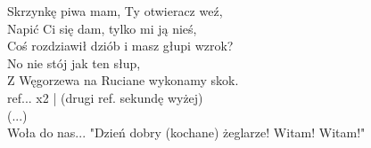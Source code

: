 Skrzynkę piwa mam, Ty otwieracz weź, \\
Napić Ci się dam, tylko mi ją nieś, \\
Coś rozdziawił dziób i masz głupi wzrok? \\
No nie stój jak ten słup, \\
Z Węgorzewa na Ruciane wykonamy skok. \\

ref... x2                                          | (drugi ref. sekundę wyżej) \\
(...) \\
Woła do nas... "Dzień dobry (kochane) żeglarze! Witam! Witam!" \\